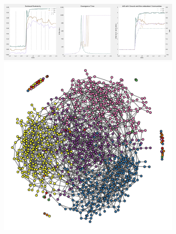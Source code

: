 \documentclass[11pt]{article}
\begin{document}
\begin{figure}[!htb]
\centering
\begin{subfigure}{\textwidth}
	\begin{mdframed}
		\includegraphics[width = .74\textwidth]{fourcom_varyinggamma4c.pdf}
		\includegraphics[width = .24\textwidth]{igraph_even_commlayout4c.pdf}
		\hspace{-.2in}
		\begin{minipage}[c]{0.001\textwidth}
		\caption{ \label{fig:igeven}}
		\end{minipage}%
	\end{mdframed}
\end{subfigure}%


\end{figure}
\end{document}
